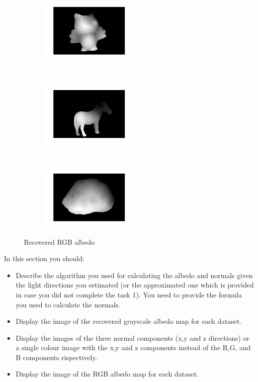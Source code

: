 \documentclass{paper}
\begin{document}
\begin{figure}[h!]
\begin{subfigure}[]{0.33\textwidth}
        \centering
        \includegraphics[height=1.2in]{owlDM}
    \end{subfigure}%
    ~ 
    \begin{subfigure}[]{0.33\textwidth}
        \centering
        \includegraphics[height=1.2in]{zebraDM}
    \end{subfigure}%
    ~ 
    \begin{subfigure}[]{0.33\textwidth}
        \centering
        \includegraphics[height=1.2in]{rockDM}
    \end{subfigure}

    \caption{Recovered RGB albedo}    
\end{figure}




In this section you should:

\begin{itemize}
\item Describe the algorithm you used for calculating the albedo and normals given the light directions you estimated (or the approximated one which is provided in case you did not complete the task 1). You need to provide the formula you used to calculate the normals.

\item Display the image of the recovered grayscale albedo map for each dataset.
\item Display the images of the three normal components (x,y and z directions) or a single colour image with the x,y and z components instead of the R,G, and B components rispectively.
\item Display the image of the RGB albedo map for each dataset. 
\end{itemize}
\end{document}
